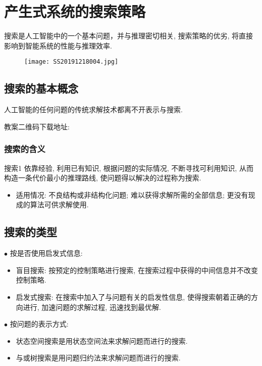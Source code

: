 \chapter{产生式系统的搜索策略}\label{AIchap4}
\begin{tcolorbox}[colback=white!50,colframe=orange!50,title=搜索]
    搜索是人工智能中的一个基本问题，并与推理密切相关, 搜索策略的优劣, 将直接影响到智能系统的性能与推理效率.\hfill
\end{tcolorbox}
\begin{figure}[H]
    \centering
    \texttt{[image: SS20191218004.jpg]}
    \label{SS20191218004}
\end{figure}
\section{搜索的基本概念}
    人工智能的任何问题的传统求解技术都离不开表示与搜索.

    教案二维码下载地址: 
\subsection{搜索的含义}
\begin{mydef}{搜索}{1}
    依靠经验, 利用已有知识, 根据问题的实际情况, 不断寻找可利用知识, 从而构造一条代价最小的推理路线, 使问题得以解决的过程称为搜索.
\end{mydef}

\begin{itemize}
\item 适用情况: 不良结构或非结构化问题; 难以获得求解所需的全部信息; 更没有现成的算法可供求解使用.
\end{itemize}
\section{搜索的类型}

$\bullet$ 按是否使用启发式信息:
    \begin{itemize}
        \item 盲目搜索: 按预定的控制策略进行搜索, 在搜索过程中获得的中间信息并不改变控制策略.
        \item 启发式搜索: 在搜索中加入了与问题有关的启发性信息, 使得搜索朝着正确的方向进行, 加速问题的求解过程, 迅速找到最优解.
    \end{itemize}
$\bullet$ 按问题的表示方式:
    \begin{itemize}
        \item 状态空间搜索是用状态空间法来求解问题而进行的搜索.
        \item 与或树搜索是用问题归约法来求解问题而进行的搜索.
    \end{itemize}

